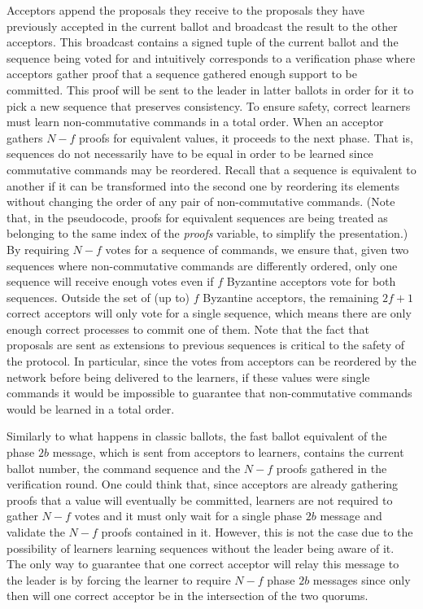 Acceptors append the proposals they receive to the proposals they have previously accepted in the current ballot and broadcast the result to the other acceptors. This broadcast contains a signed tuple of the current ballot and the sequence being voted for and intuitively corresponds to a verification phase where acceptors gather proof that a sequence gathered enough support to be committed. This proof will be sent to the leader in latter ballots in order for it to pick a new sequence that preserves consistency. To ensure safety, correct learners must learn non-commutative commands in a total order. When an acceptor gathers $N-f$ proofs for equivalent values, it proceeds to the next phase. That is, sequences do not necessarily have to be equal in order to be learned since commutative commands may be reordered. Recall that a sequence is equivalent to another if it can be transformed into the second one by reordering its elements without changing the order of any pair of non-commutative commands. (Note that, in the pseudocode, proofs for equivalent sequences are being treated as belonging to the same index of the \emph{proofs} variable, to simplify the presentation.) By requiring $N-f$ votes for a sequence of commands, we ensure that, given two sequences where non-commutative commands are differently ordered, only one sequence will receive enough votes even if $f$ Byzantine acceptors vote for both sequences. Outside the set of (up to) $f$ Byzantine acceptors, the remaining $2f+1$ correct acceptors will only vote for a single sequence, which means there are only enough correct processes to commit one of them. Note that the fact that proposals are sent as extensions to previous sequences is critical to the safety of the protocol. In particular, since the votes from acceptors can be reordered by the network before being delivered to the learners, if these values were single commands it would be impossible to guarantee that non-commutative commands would be learned in a total order. \par
{} Similarly to what happens in classic ballots, the fast ballot equivalent of the phase $2b$ message, which is sent from acceptors to learners, contains the current ballot number, the command sequence and the $N-f$ proofs gathered in the verification round. One could think that, since acceptors are already gathering proofs that a value will eventually be committed, learners are not required to gather $N-f$ votes and it must only wait for a single phase $2b$ message and validate the $N-f$ proofs contained in it. However, this is not the case due to the possibility of learners learning sequences without the leader being aware of it. The only way to guarantee that one correct acceptor will relay this message to the leader is by forcing the learner to require $N-f$ phase $2b$ messages since only then will one correct acceptor be in the intersection of the two quorums. \par
